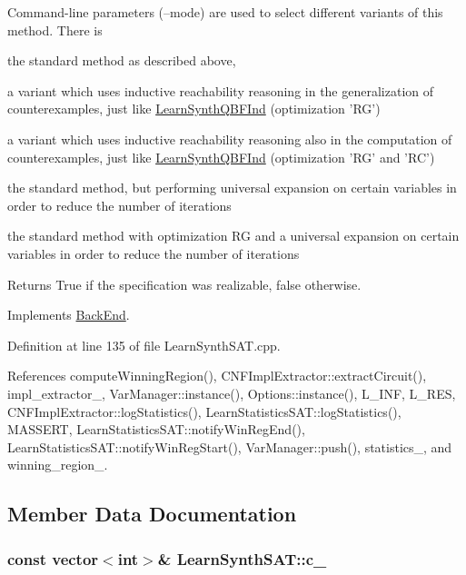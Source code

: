 Command-\/line parameters (--mode) are used to select different variants of this method. There is 
\begin{DoxyItemize}
\item the standard method as described above, 
\item a variant which uses inductive reachability reasoning in the generalization of counterexamples, just like \hyperlink{classLearnSynthQBFInd}{Learn\-Synth\-Q\-B\-F\-Ind} (optimization 'R\-G') 
\item a variant which uses inductive reachability reasoning also in the computation of counterexamples, just like \hyperlink{classLearnSynthQBFInd}{Learn\-Synth\-Q\-B\-F\-Ind} (optimization 'R\-G' and 'R\-C') 
\item the standard method, but performing universal expansion on certain variables in order to reduce the number of iterations 
\item the standard method with optimization R\-G and a universal expansion on certain variables in order to reduce the number of iterations 
\end{DoxyItemize}

\begin{DoxyReturn}{Returns}
True if the specification was realizable, false otherwise. 
\end{DoxyReturn}


Implements \hyperlink{classBackEnd_a099e717dc71e9cc2d838b1ca86340590}{Back\-End}.



Definition at line 135 of file Learn\-Synth\-S\-A\-T.\-cpp.



References compute\-Winning\-Region(), C\-N\-F\-Impl\-Extractor\-::extract\-Circuit(), impl\-\_\-extractor\-\_\-, Var\-Manager\-::instance(), Options\-::instance(), L\-\_\-\-I\-N\-F, L\-\_\-\-R\-E\-S, C\-N\-F\-Impl\-Extractor\-::log\-Statistics(), Learn\-Statistics\-S\-A\-T\-::log\-Statistics(), M\-A\-S\-S\-E\-R\-T, Learn\-Statistics\-S\-A\-T\-::notify\-Win\-Reg\-End(), Learn\-Statistics\-S\-A\-T\-::notify\-Win\-Reg\-Start(), Var\-Manager\-::push(), statistics\-\_\-, and winning\-\_\-region\-\_\-.



\subsection{Member Data Documentation}
\hypertarget{classLearnSynthSAT_ad4c8ac8ca9b023a4a81fe7e3e2dcaa96}{
\subsubsection[{c\-\_\-}]{\setlength{\rightskip}{0pt plus 5cm}const vector$<$int$>$\& Learn\-Synth\-S\-A\-T\-::c\-\_\-\hspace{0.3cm}{\ttfamily [protected]}}}\label{classLearnSynthSAT_ad4c8ac8ca9b023a4a81fe7e3e2dcaa96}



